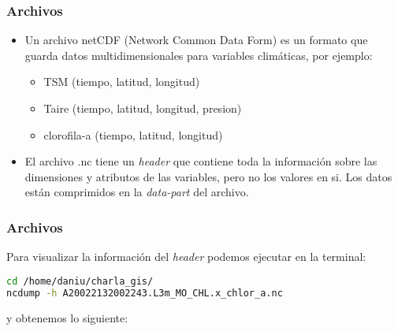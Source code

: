 \documentclass{beamer}
\begin{document}
\begin{frame}[fragile]
\frametitle{Archivos}

\begin{itemize}
	
\item<1-> Un archivo netCDF (Network Common Data Form) es un formato que guarda datos multidimensionales para variables climáticas, por ejemplo:

\begin{itemize}
	
	\item<2-> TSM (tiempo, latitud, longitud)
	\item<2-> Taire (tiempo, latitud, longitud, presion)
	\item<2-> clorofila-a (tiempo, latitud, longitud)
	
\end{itemize}

\item<3-> El archivo .nc tiene un \textit{header} que contiene toda la información sobre las dimensiones y atributos de las variables, pero no los valores en si. Los datos están comprimidos en la \textit{data-part} del archivo. 

\end{itemize}

\end{frame}


\begin{frame}[fragile]
\frametitle{Archivos}

Para visualizar la información del \textit{header} podemos ejecutar en la terminal:

\begin{lstlisting}[language=bash, basicstyle=\scriptsize]
cd /home/daniu/charla_gis/
ncdump -h A20022132002243.L3m_MO_CHL.x_chlor_a.nc
\end{lstlisting}

y obtenemos lo siguiente:

\begin{figure}


\end{figure}

\end{frame}
\end{document}
